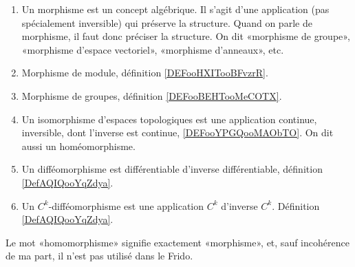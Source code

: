 
	\label{THEMEooMorphismes}
\begin{enumerate}
	\item
	      Un morphisme est un concept algébrique. Il s'agit d'une application (pas spécialement inversible) qui préserve la structure. Quand on parle de morphisme, il faut donc préciser la structure. On dit «morphisme de groupe», «morphisme d'espace vectoriel», «morphisme d'anneaux», etc.
	\item
	      Morphisme de module, définition \ref{DEFooHXITooBFvzrR}.
      \item
          Morphisme de groupes, définition \ref{DEFooBEHTooMeCOTX}.
	\item
        Un isomorphisme d'espaces topologiques est une application continue, inversible, dont l'inverse est continue, \ref{DEFooYPGQooMAObTO}. On dit aussi un homéomorphisme.
	\item
	      Un difféomorphisme est différentiable d'inverse différentiable, définition \ref{DefAQIQooYqZdya}.
	\item
	      Un \( C^k\)-difféomorphisme est une application \( C^k\) d'inverse \( C^k\). Définition \ref{DefAQIQooYqZdya}.
\end{enumerate}
Le mot «homomorphisme» signifie exactement «morphisme», et, sauf incohérence de ma part, il n'est pas utilisé dans le Frido.

